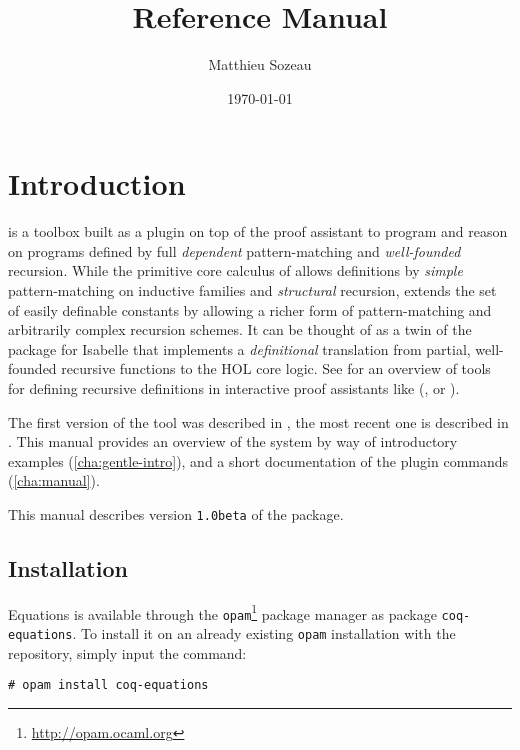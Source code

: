\documentclass{report}
\author{Matthieu Sozeau}
\date{\today}
\title{\Equations \eqnversion Reference Manual}
\def\eqnversion{\texttt{1.0beta}\xspace}
\begin{document}
\maketitle

\def\coqlibrary#1#2#3{}

\def\Equations{\texorpdfstring{\name{Equations}}{Equations}}

\chapter*{Introduction}
\label{cha:introduction}

\Equations is a toolbox built as a plugin on top of the \Coq proof assistant
to program and reason on programs defined by full \emph{dependent}
pattern-matching and \emph{well-founded} recursion. While the primitive
core calculus of \Coq allows definitions by \emph{simple} pattern-matching on
inductive families and \emph{structural} recursion, \Equations extends
the set of easily definable constants by allowing a richer form of
pattern-matching and arbitrarily complex recursion schemes. It can be
thought of as a twin of the  package for Isabelle that
implements a \emph{definitional} translation from partial, well-founded
recursive functions to the HOL core logic. See
\cite{BoveKraussSozeau2011} for an overview of tools for defining
recursive definitions in interactive proof assistants like (\Coq, \Agda
or \Isabelle).

The first version of the tool was described in
\cite{sozeau.Coq/Equations/ITP10}, the most recent one is described in
\cite{mansoz17}. This manual provides an overview of the system by way
of introductory examples (\autoref{cha:gentle-intro}), and a
short documentation of the plugin commands (\autoref{cha:manual}).

This manual describes version \eqnversion of the package.

\section*{Installation}

Equations is available through the
\texttt{opam}\footnote{\url{http://opam.ocaml.org}} package manager as
package \texttt{coq-equations}. To install it on an already existing
\texttt{opam} installation with the \Coq repository, simply input the
command:
\begin{verbatim}
# opam install coq-equations
\end{verbatim}
\end{document}
